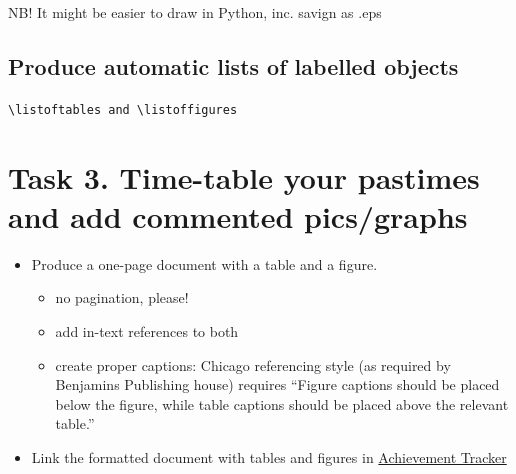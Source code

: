 \documentclass[a4paper,11pt]{article}
\begin{document}

NB! It might be easier to draw in Python, inc. savign as .eps

\subsection{Produce automatic lists of labelled objects}

\verb|\listoftables and \listoffigures|

\listoftables
\listoffigures

\section*{Task 3. Time-table your pastimes and add commented pics/graphs}
\label{task}

\begin{tcolorbox}[width=\textwidth, colback={yellow!40!white}, title={}, colbacktitle=yellow!60!white, coltitle=black]
	\begin{itemize}
		\item Produce a one-page document with a table and a figure. 
		\begin{itemize}
			\item no pagination, please!
			\item add in-text references to both
			\item create proper captions: Chicago referencing style (as required by Benjamins Publishing house) requires ``Figure captions should be placed below the figure, while table captions should be placed above the relevant table.'' 
		\end{itemize} 
		\item Link the formatted document with tables and figures in  \href{https://docs.google.com/document/d/17ZBAQGBKIlO6JMwxz3LlghYq1sdsUjhHVXga46BK0kg/edit?usp=sharing}{Achievement Tracker}
	\end{itemize}
	
\end{tcolorbox}%
\end{document}
